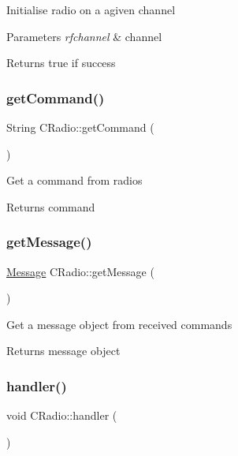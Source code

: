 Initialise radio on a agiven channel 
\begin{DoxyParams}{Parameters}
{\em rfchannel} & channel \\
\hline
\end{DoxyParams}
\begin{DoxyReturn}{Returns}
true if success 
\end{DoxyReturn}
\mbox{\label{class_c_radio_a4a1667eb762009621964b8ac4b699fc2}} 
\subsubsection{\texorpdfstring{get\+Command()}{getCommand()}}
{\footnotesize\ttfamily String C\+Radio\+::get\+Command (\begin{DoxyParamCaption}{ }\end{DoxyParamCaption})}

Get a command from radios \begin{DoxyReturn}{Returns}
command 
\end{DoxyReturn}
\mbox{\label{class_c_radio_afa712b350b446f1e213c1bf2e245435f}} 
\subsubsection{\texorpdfstring{get\+Message()}{getMessage()}}
{\footnotesize\ttfamily \hyperlink{class_message}{Message} C\+Radio\+::get\+Message (\begin{DoxyParamCaption}{ }\end{DoxyParamCaption})}

Get a message object from received commands \begin{DoxyReturn}{Returns}
message object 
\end{DoxyReturn}
\mbox{\label{class_c_radio_a183b9b5793be1d712fc2135f6c35b7ea}} 
\subsubsection{\texorpdfstring{handler()}{handler()}}
{\footnotesize\ttfamily void C\+Radio\+::handler (\begin{DoxyParamCaption}{ }\end{DoxyParamCaption})}

